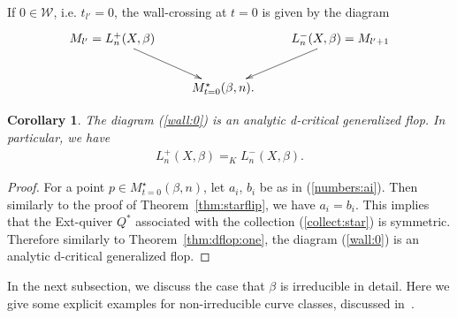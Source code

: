 \documentclass[11pt]{amsart}
\theoremstyle{plain}
\newtheorem{cor}[thm]{Corollary}
\theoremstyle{definition}
\theoremstyle{remark}
\newcommand{\wW}{\mathcal{W}}
\begin{document}
If $0 \in \wW$,
i.e. $t_{l'}=0$, the wall-crossing 
at $t=0$ is given by the diagram
\begin{align}\label{wall:0}
\xymatrix{
M_{l'}=L_n^{+}(X, \beta) \ar[rd] &  & L_n^{-}(X, \beta) =
M_{l'+1} \ar[ld] \\
& M_{t=0}^{\star}(\beta, n). &
}
\end{align}
\begin{cor}\label{cor:star:dflop}
The diagram (\ref{wall:0}) is an analytic d-critical 
generalized flop.
In particular, we have 
\begin{align*}
L_n^{+}(X, \beta)=_K L_n^{-}(X, \beta).
\end{align*} 
\end{cor}
\begin{proof}
For a point $p \in M_{t=0}^{\star}(\beta, n)$, 
let $a_i$, $b_i$ be as in (\ref{numbers:ai}). 
Then similarly to the proof of Theorem~\ref{thm:starflip}, 
we have $a_i=b_i$. 
This implies that the Ext-quiver $Q^{\ast}$ associated with
the collection (\ref{collect:star}) is symmetric. 
Therefore similarly to Theorem~\ref{thm:dflop:one}, the 
diagram (\ref{wall:0}) is an analytic d-critical 
generalized flop.
\end{proof} 

In the next subsection, we discuss the case 
that $\beta$ is irreducible in detail. 
Here we give some 
explicit examples for non-irreducible curve classes, 
discussed in~\cite[Section~5]{Tolim}. 
\end{document}
